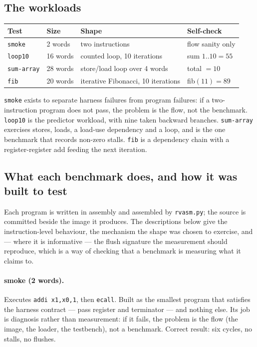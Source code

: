 \documentclass[11pt]{article}
\begin{document}
\subsection{The workloads}

\begin{center}
\begin{tabular}{llll}
\hline
Test & Size & Shape & Self-check \\
\hline
\texttt{smoke} & 2 words & two instructions & flow sanity only \\
\texttt{loop10} & 16 words & counted loop, 10 iterations & sum $1..10 = 55$ \\
\texttt{sum-array} & 28 words & store/load loop over 4 words & total $= 10$ \\
\texttt{fib} & 20 words & iterative Fibonacci, 10 iterations & fib$(11) = 89$ \\
\hline
\end{tabular}
\end{center}

\texttt{smoke} exists to separate harness failures from program failures: if a
two-instruction program does not pass, the problem is the flow, not the benchmark.
\texttt{loop10} is the predictor workload, with nine taken backward branches.
\texttt{sum-array} exercises stores, loads, a load-use dependency and a loop, and is the
one benchmark that records non-zero stalls. \texttt{fib} is a dependency chain with a
register-register add feeding the next iteration.

\subsection{What each benchmark does, and how it was built to test}

Each program is written in assembly and assembled by \texttt{rvasm.py}; the source is
committed beside the image it produces. The descriptions below give the instruction-level
behaviour, the mechanism the shape was chosen to exercise, and --- where it is informative
--- the flush signature the measurement should reproduce, which is a way of checking that
a benchmark is measuring what it claims to.

\paragraph{smoke (2 words).} Executes \texttt{addi x1,x0,1}, then \texttt{ecall}.
Built as the smallest program that satisfies the harness contract --- pass register and
terminator --- and nothing else. Its job is diagnosis rather than measurement: if it fails,
the problem is the flow (the image, the loader, the testbench), not a benchmark. Correct
result: six cycles, no stalls, no flushes.
\end{document}
